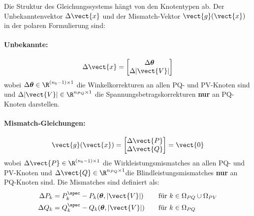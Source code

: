 Die Struktur des Gleichungssystems hängt von den Knotentypen ab. Der Unbekanntenvektor $\Delta \vect{x}$ und der Mismatch-Vektor $\vect{g}(\vect{x})$ in der polaren Formulierung sind:

\paragraph{Unbekannte:}
\begin{equation}
	\Delta \vect{x} = 
	\begin{bmatrix}
		\Delta \boldsymbol{\theta} \\
		\Delta |\vect{V}|
	\end{bmatrix}
	\label{eq:unbekannte_polar}
\end{equation}
wobei $\Delta \boldsymbol{\theta} \in \R^{(n_b - 1) \times 1}$ die Winkelkorrekturen an allen PQ- und PV-Knoten sind und $\Delta |\vect{V}| \in \R^{n_{PQ} \times 1}$ die Spannungsbetragskorrekturen \textbf{nur} an PQ-Knoten darstellen.


\paragraph{Mismatch-Gleichungen:}
\begin{equation}
	\vect{g}(\vect{x}) = 
	\begin{bmatrix}
		\Delta \vect{P} \\
		\Delta \vect{Q}
	\end{bmatrix}
	= \vect{0}
	\label{eq:mismatch_polar}
\end{equation}
wobei $\Delta \vect{P} \in \R^{(n_b - 1) \times 1}$ die Wirkleistungsmismatches an allen PQ- und PV-Knoten und $\Delta \vect{Q} \in \R^{n_{PQ} \times 1}$die Blindleistungsmismatches \textbf{nur} an PQ-Knoten sind.
Die Mismatches sind definiert als:
\begin{align}
	\Delta P_k &= P_k^{\spec} - P_k(\boldsymbol{\theta}, |\vect{V}|) \quad &&\text{für } k \in \Omega_{PQ} \cup \Omega_{PV} \label{eq:dP_polar}\\
	\Delta Q_k &= Q_k^{\spec} - Q_k(\boldsymbol{\theta}, |\vect{V}|) \quad &&\text{für } k \in \Omega_{PQ} \label{eq:dQ_polar}
\end{align}

